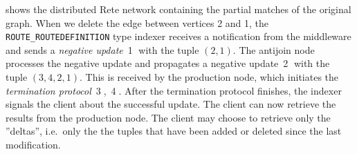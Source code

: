  shows the distributed Rete network containing the partial matches of the original graph. When we delete the edge between vertices 2 and 1, the \texttt{ROUTE\_ROUTEDEFINITION} type indexer receives a notification from the middleware and sends a \textit{negative update}~\textcircled{1} with the tuple $(2, 1)$. The antijoin node processes the negative update and propagates a negative update~\textcircled{2} with the tuple $(3, 4, 2, 1)$. This is received by the production node, which initiates the \textit{termination protocol}~\textcircled{3},~\textcircled{4}. After the termination protocol finishes, the indexer signals the client about the successful update. The client can now retrieve the results from the production node. The client may choose to retrieve only the ''deltas'', i.e.\ only the the tuples that have been added or deleted since the last modification.


